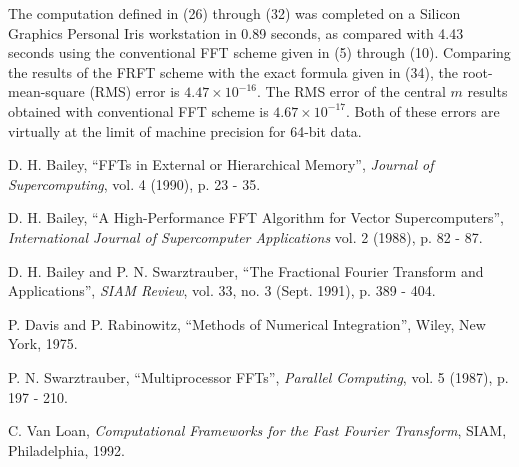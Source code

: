 The computation defined in (26) through (32) was completed on a
Silicon Graphics Personal Iris workstation in 0.89 seconds, as
compared with 4.43 seconds using the conventional FFT scheme given in
(5) through (10).  Comparing the results of the FRFT scheme with the
exact formula given in (34), the root-mean-square (RMS) error is $4.47
\times 10^{-16}$.  The RMS error of the central $m$ results obtained
with conventional FFT scheme is $4.67 \times 10^{-17}$.  Both of these
errors are virtually at the limit of machine precision for 64-bit
data.

\begin{thebibliography}{5}

 D. H. Bailey, ``FFTs in External or Hierarchical
Memory'', {\sl Journal of Supercomputing}, vol. 4 (1990), p. 23 - 35.

 D. H. Bailey, ``A High-Performance FFT Algorithm for
Vector Supercomputers'', {\sl International Journal of Supercomputer
Applications} vol. 2 (1988), p. 82 - 87.

 D. H. Bailey and P. N. Swarztrauber, ``The Fractional
Fourier Transform and Applications'', {\sl SIAM Review}, vol. 33, no.
3 (Sept.  1991), p. 389 - 404.

 P. Davis and P. Rabinowitz, ``Methods of Numerical
Integration'', Wiley, New York, 1975.

 P. N. Swarztrauber, ``Multiprocessor FFTs'', {\sl
Parallel Computing}, vol. 5 (1987), p. 197 - 210.

 C. Van Loan, {\sl Computational Frameworks for the
Fast Fourier Transform}, SIAM, Philadelphia, 1992.

\end{thebibliography}




